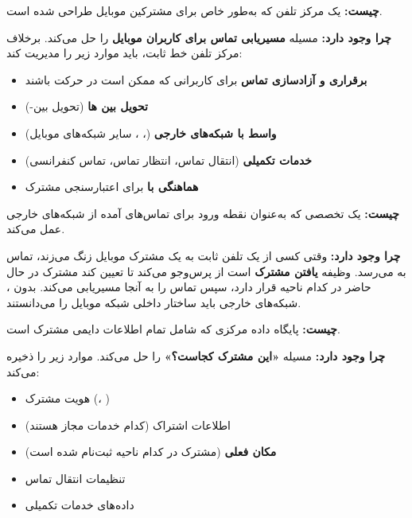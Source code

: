 
\textbf{چیست:} یک مرکز تلفن که به‌طور خاص برای مشترکین موبایل طراحی شده است.

\textbf{چرا وجود دارد:}  مسیله \textbf{مسیریابی تماس برای کاربران موبایل} را حل می‌کند. برخلاف مرکز تلفن خط ثابت،  باید موارد زیر را مدیریت کند:

\begin{itemize}
\tightlist
\item
  \textbf{برقراری و آزادسازی تماس} برای کاربرانی که ممکن است در حرکت باشند
\item
  \textbf{تحویل بین ها} (تحویل بین-)
\item
  \textbf{واسط با شبکه‌های خارجی} (، ، سایر شبکه‌های موبایل)
\item
  \textbf{خدمات تکمیلی} (انتقال تماس، انتظار تماس، تماس کنفرانسی)
\item
  \textbf{هماهنگی با } برای اعتبارسنجی مشترک
\end{itemize}


\textbf{چیست:} یک  تخصصی که به‌عنوان نقطه ورود برای تماس‌های آمده از شبکه‌های خارجی عمل می‌کند.

\textbf{چرا وجود دارد:} وقتی کسی از یک تلفن ثابت به یک مشترک موبایل زنگ می‌زند، تماس به  می‌رسد. وظیفه  \textbf{یافتن مشترک} است  از  پرس‌وجو می‌کند تا تعیین کند مشترک در حال حاضر در کدام ناحیه  قرار دارد، سپس تماس را به آنجا مسیریابی می‌کند. بدون ، شبکه‌های خارجی باید ساختار داخلی شبکه موبایل را می‌دانستند.


\textbf{چیست:} پایگاه داده مرکزی که شامل تمام اطلاعات دایمی مشترک است.

\textbf{چرا وجود دارد:}  مسیله \textbf{«این مشترک کجاست؟»} را حل می‌کند. موارد زیر را ذخیره می‌کند:

\begin{itemize}
\tightlist
\item
  هویت مشترک (، )
\item
  اطلاعات اشتراک (کدام خدمات مجاز هستند)
\item
  \textbf{مکان فعلی} (مشترک در کدام ناحیه  ثبت‌نام شده است)
\item
  تنظیمات انتقال تماس
\item
  داده‌های خدمات تکمیلی
\end{itemize}

